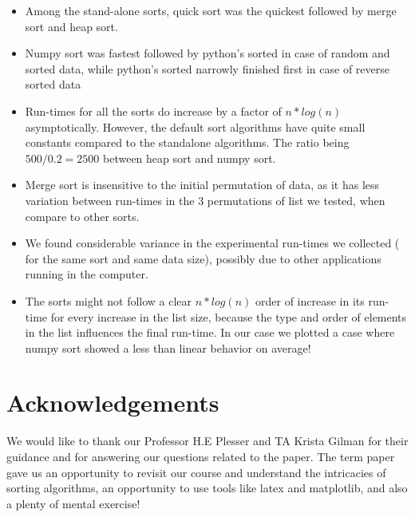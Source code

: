 \documentclass[sigconf, nonacm, natbib, screen, balance=False]{acmart}
\begin{document}
\begin{itemize}
\item Among the stand-alone sorts, quick sort was the quickest followed by merge sort and heap sort.
\item Numpy sort was fastest followed by python's sorted in case of random and sorted data, while python's sorted narrowly finished first in case of reverse sorted data
\item Run-times for all the sorts do increase by a factor of $n*log(n)$ asymptotically. However, the default sort algorithms have quite small constants compared to the standalone algorithms. The ratio being $500/0.2 = 2500$ between heap sort and numpy sort.
\item Merge sort is insensitive to the initial permutation of data, as it has less variation between run-times in the 3 permutations of list we tested, when compare to other sorts.
\item We found considerable variance in the experimental run-times we collected ( for the same sort and same data size), possibly due to other applications running in the computer.
\item The sorts might not follow a clear $n*log(n)$ order of increase in its run-time for every increase in the list size, because the type and order of elements in the list influences the final run-time. In our case we plotted a case where numpy sort showed a less than linear behavior on average!
\end{itemize}

\section{Acknowledgements}\label{sec:acknowledgements}
We would like to thank our Professor H.E Plesser and TA Krista Gilman for their guidance and for answering our questions related to the paper. The term paper gave us an opportunity to revisit our course and understand the intricacies of sorting algorithms, an opportunity to use tools like latex and matplotlib, and also a plenty of mental exercise!



\end{document}
